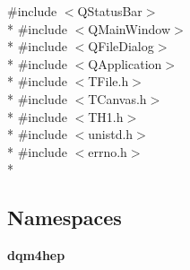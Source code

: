 {\ttfamily \#include $<$Q\+Status\+Bar$>$}\\*
{\ttfamily \#include $<$Q\+Main\+Window$>$}\\*
{\ttfamily \#include $<$Q\+File\+Dialog$>$}\\*
{\ttfamily \#include $<$Q\+Application$>$}\\*
{\ttfamily \#include $<$T\+File.\+h$>$}\\*
{\ttfamily \#include $<$T\+Canvas.\+h$>$}\\*
{\ttfamily \#include $<$T\+H1.\+h$>$}\\*
{\ttfamily \#include $<$unistd.\+h$>$}\\*
{\ttfamily \#include $<$errno.\+h$>$}\\*
\subsection*{Namespaces}
\begin{DoxyCompactItemize}
\item 
 {\bf dqm4hep}
\end{DoxyCompactItemize}
